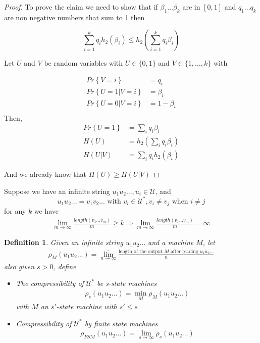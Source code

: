 \documentclass[twoside]{article}
\newtheorem{definition}{Definition}[section]
\theoremstyle{definition} %
\renewcommand{\Pr}[1]{Pr\left\{#1\right\}}
\def\U{\mathcal{U}}
\begin{document}
\begin{proof}
  To prove the claim we need to show that if $\beta_1\dots \beta_k$ are in $[0,1]$ and $q_1 \dots q_k$ are non negative numbers that sum to 1 then

  \[
    \sum_{i=1}^k q_i h_2(\beta_i) \leq h_2 \left(\sum_{i=1}^k q_i \beta_i \right)
  \]

  Let $U$ and $V$ be random variables with $U \in \{0,1\}$ and $V \in \{1,\dots,k\}$ with

  \begin{align*}
    \Pr{V=i} &= q_i\\
    \Pr{U=1|V=i} &= \beta_i\\
    \Pr{U=0|V=i} &= 1- \beta_i\\
  \end{align*}
  Then,
  \begin{align*}
    \Pr{U=1} &= \sum_i q_i \beta_i\\
    H(U) &= h_2\left(\sum_i q_i \beta_i \right)\\
    H(U|V) &= \sum_i q_i h_2(\beta_i)
  \end{align*}

  And we already know that $H(U) \geq H(U|V)$
\end{proof}


Suppose we have an infinite string $u_1 u_2 ..., u_i \in \U$, and
$$u_1 u_2 ... = v_1 v_2 ... \text{ with } v_i \in \U^*, v_i \neq v_j \text{ when } i \neq j$$
for any $k$ we have
\begin{align*}
  \lim_{m \to \infty} \frac{length(v_1...v_m)}{m} \geq k
  \Rightarrow \lim_{m \to \infty} \frac{length(v_1 ... v_m)}{m} =
  \infty
\end{align*}

\begin{definition}
  Given an infinite string $u_1 u_2 ...$ and a machine $M$, let
  \begin{align*}
    \rho_{M}(u_1 u_2 ...) = \overline{\lim_{n \to \infty}} \frac{\text{length of the output } M \text{ after reading } u_1 u_2...}{n}
  \end{align*}
  also given $s > 0$, define
  \begin{itemize}
    \item The compressibility of $\U^*$ be s-state machines
    \begin{align*}
      \rho_s (u_1 u_2 ...) = \min_{M} \rho_{M}(u_1 u_2 ...)
    \end{align*}
    with $M$ an $s'$-state machine with $s' \leq s$
    \item Compressibility of $\U^*$ by finite state machines
    \begin{align*}
      \rho_{FSM} (u_1 u_2 ...) = \lim_{s \to \infty} \rho_s (u_1 u_2 ...)
    \end{align*}
  \end{itemize}
\end{definition}
\end{document}
